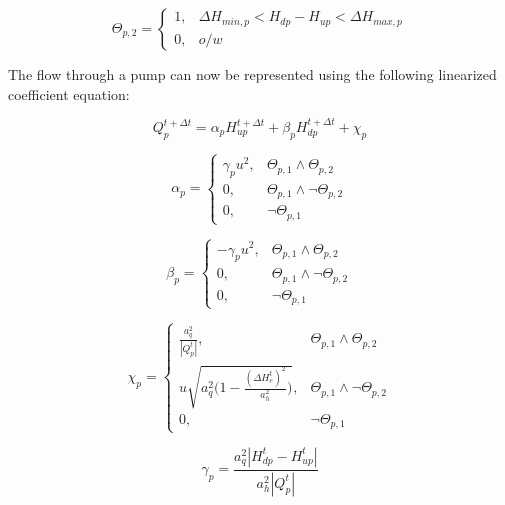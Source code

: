 \documentclass[11pt]{article}
\begin{document}
\begin{equation}
  \Theta_{p,2} =
  \begin{cases}
    1, & \Delta H_{min,p} < H_{dp} - H_{up} < \Delta H_{max,p} \\
    0, & o/w
  \end{cases}
\end{equation}

The flow through a pump can now be represented using the following linearized
coefficient equation:

\begin{equation}
 Q_{p}^{t + \Delta t} = \alpha_{p} H_{up}^{t + \Delta t} + \beta_{p} H_{dp}^{t + \Delta t} + \chi_{p} 
\end{equation}

\begin{equation}
  \alpha_{p} =
  \begin{cases}
   \gamma_p u^2, & \Theta_{p,1} \land \Theta_{p,2}\\
   0, & \Theta_{p,1} \land \lnot \Theta_{p,2}\\
   0, & \lnot \Theta_{p,1}
  \end{cases}
\end{equation}

\begin{equation}
  \beta_{p} =
  \begin{cases}
   -\gamma_p u^2, & \Theta_{p,1} \land \Theta_{p,2}\\
   0, & \Theta_{p,1} \land \lnot \Theta_{p,2}\\
   0, & \lnot \Theta_{p,1}
  \end{cases}
\end{equation}

\begin{equation}
  \chi_{p} =
  \begin{cases}
   \frac{a_q^2}{|Q_p^t|}, & \Theta_{p,1} \land \Theta_{p,2}\\
   u \sqrt{a_q^2 \bigl( 1 - \frac{(\Delta H_{e}^t)^2}{a_h^2} \bigr)}, & \Theta_{p,1} \land \lnot \Theta_{p,2}\\
   0, & \lnot \Theta_{p,1}
  \end{cases}
\end{equation}

\begin{equation}
 \gamma_p = \frac{a_q^2 |H_{dp}^t - H_{up}^t|}{a_h^2 |Q_{p}^t|}
\end{equation}
\end{document}
